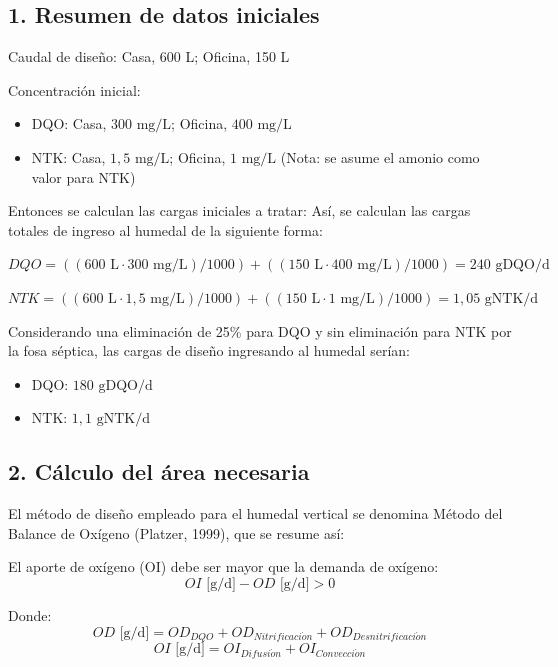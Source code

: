 \documentclass[12pt, letterpaper]{report}
\begin{document}
\subsection*{1. Resumen de datos iniciales}
Caudal de diseño: Casa, 600 L; Oficina, 150 L

Concentración inicial:
\begin{itemize}
    \item DQO: Casa, $300\text{ mg/L}$; Oficina, $400\text{ mg/L}$
    \item NTK: Casa, $1,5\text{ mg/L}$; Oficina, $1\text{ mg/L}$ (Nota: se asume el amonio como valor para NTK)
\end{itemize}

Entonces se calculan las cargas iniciales a tratar:
Así, se calculan las cargas totales de ingreso al humedal de la siguiente forma:

$DQO = ((600\text{ L} \cdot 300\text{ mg/L}) / 1000) + ((150\text{ L} \cdot 400\text{ mg/L}) / 1000) = 240\text{ gDQO/d}$

$NTK = ((600\text{ L} \cdot 1,5\text{ mg/L}) / 1000) + ((150\text{ L} \cdot 1\text{ mg/L}) / 1000) = 1,05\text{ gNTK/d}$

Considerando una eliminación de 25\% para DQO y sin eliminación para NTK por la fosa séptica, las cargas de diseño ingresando al humedal serían:
\begin{itemize}
    \item DQO: $180\text{ gDQO/d}$
    \item NTK: $1,1\text{ gNTK/d}$
\end{itemize}

\subsection*{2. Cálculo del área necesaria}
El método de diseño empleado para el humedal vertical se denomina Método del Balance de Oxígeno (Platzer, 1999), que se resume así:

El aporte de oxígeno (OI) debe ser mayor que la demanda de oxígeno:
\begin{equation*}
OI\text{ [g/d]} - OD\text{ [g/d]} > 0
\end{equation*}

Donde:
\begin{equation*}
OD\text{ [g/d]} = OD_{DQO} + OD_{Nitrificaci\acute{o}n} + OD_{Desnitrificaci\acute{o}n}
\end{equation*}
\begin{equation*}
OI\text{ [g/d]} = OI_{Difusi\acute{o}n} + OI_{Convecci\acute{o}n}
\end{equation*}
\end{document}
